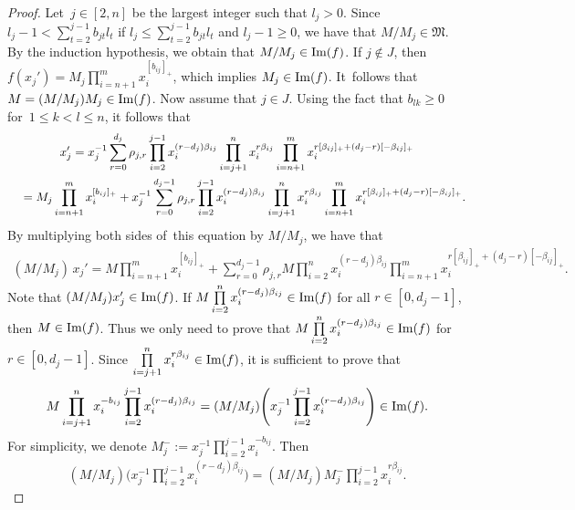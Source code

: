 \documentclass[10pt,a4paper]{amsart}
\numberwithin{equation}{section}
\begin{document}
\begin{proof}
Let~$j\in[2,n]$ be the largest integer such that $l_{j}>0$. Since $l_{j}-1 <\sum\limits_{t=2}^{j-1}b_{jt}l_{t}$ if $l_{j} \leq\sum\limits_{t=2}^{j-1}b_{jt}l_{t}$ and $l_j-1\geq0$, we have that $M/M_j\in\mathfrak{M}$. By the induction hypothesis, we obtain that $M/M_j\in\mathop{\rm Im}(f)$. If $j\notin J$, then $f(x_{j}')=M_j\prod\limits_{i=n+1}^{m}x_{i}^{[b_{ij}]_+}$, which implies $M_j\in \mathop{\rm Im}(f)$. It~fol\-lows that $M=(M/M_j) M_j\in\mathop{\rm Im}(f)$. Now assume that $j\in J$. Using the fact that $b_{lk}\geq0$ for~$1\leq k< l\leq n$, it follows that
\begin{gather*}
 x_{j}'= x_{j}^{-1}\sum\limits_{r=0}^{d_j}\rho_{j,r} \prod\limits_{i=2}^{j-1}x_{i}^{(r-d_j)\beta_{ij}} \prod\limits_{i=j+1}^{n}x_{i}^{r\beta_{ij} } \prod\limits_{i=n+1}^{m}x_{i}^{r[\beta_{ij}]_{+} +(d_j-r)[-\beta_{ij}]_+}
 \\ \hphantom{x_{j}'}
{}= M_j\prod\limits_{i=n+1}^{m}x_{i}^{[b_{ij}]_{+}} +x_{j}^{-1}\sum\limits_{r=0}^{d_j-1}\rho_{j,r} \prod\limits_{i=2}^{j-1}x_{i}^{(r-d_j)\beta_{ij}} \prod\limits_{i=j+1}^{n}x_{i}^{r\beta_{ij} } \prod\limits_{i=n+1}^{m}x_{i}^{r[\beta_{ij}]_{+} +(d_j-r)[-\beta_{ij}]_+}.
\end{gather*}
By multiplying both sides of~this equation by $M/M_j$, we have that
\begin{gather*}
(M/M_j)\, x_{j}'= M\prod\limits_{i=n+1}^{m}x_{i}^{[b_{ij}]_{+}} + \sum\limits_{r=0}^{d_j-1}\rho_{j,r} M\prod\limits_{i=2}^{n}x_{i}^{(r-d_j)\beta_{ij}} \prod\limits_{i=n+1}^{m}x_{i}^{r[\beta_{ij}]_{+} +(d_j-r)[-\beta_{ij}]_+}.
\end{gather*}
Note that $(M/M_j) x_{j}'\in\mathop{\rm Im}(f)$. If $M\prod\limits_{i=2}^{n}x_{i}^{(r-d_j)\beta_{ij}} \in \mathop{\rm Im}(f)$ for all $r\in[0,d_j-1]$, then $M\in\mathop{\rm Im}(f)$.
Thus we only need to prove that $M\prod\limits_{i=2}^{n}x_{i}^{(r-d_j)\beta_{ij}} \in \mathop{\rm Im}(f)$ for $r\in[0,d_j-1]$. Since $\prod\limits_{i=j+1}^{n}x_{i}^{r\beta_{ij}}\in \mathop{\rm Im}(f)$, it is sufficient to prove that
\begin{gather*}
M\prod\limits_{i=j+1}^{n}x_{i}^{-b_{ij}} \prod\limits_{i=2}^{j-1}x_{i}^{(r-d_j)\beta_{ij}} =(M/M_j)\Bigg(x_{j}^{-1} \prod\limits_{i=2}^{j-1}x_{i}^{(r-d_j)\beta_{ij}}\Bigg) \in \mathop{\rm Im}(f).
\end{gather*}
For simplicity, we denote $M_{j}^{-}:=x_{j}^{-1}\prod\limits_{i=2}^{j-1}x_{i}^{-b_{ij}}$. Then
\begin{gather*}
(M/M_j)\Bigg(x_{j}^{-1} \prod\limits_{i=2}^{j-1}x_{i}^{(r-d_j)\beta_{ij}}\Bigg)
=(M/M_j)M_{j}^{-}\prod\limits_{i=2}^{j-1}x_{i}^{r\beta_{ij}}.
\end{gather*}



\end{proof}
\end{document}
